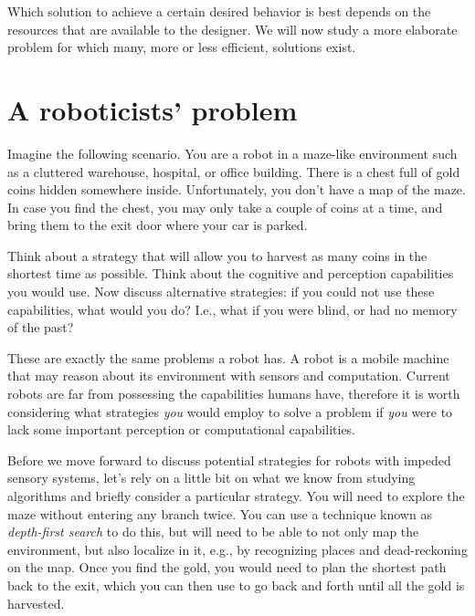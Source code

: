 Which solution to achieve a certain desired behavior is best depends on the resources that are available to the designer. We will now study a more elaborate problem for which many, more or less efficient, solutions exist.

\section{A roboticists' problem}
Imagine the following scenario. You are a robot in a maze-like environment such as a cluttered warehouse, hospital, or office building. There is a chest full of gold coins hidden somewhere inside. Unfortunately, you don't have a map of the maze. In case you find the chest, you may only take a couple of coins at a time, and bring them to the exit door where your car is parked.

\begin{mdframed}
Think about a strategy that will allow you to harvest as many coins in the shortest time as possible. Think about the cognitive and perception capabilities you would use. Now discuss alternative strategies: if you could not use these capabilities, what would you do? I.e., what if you were blind, or had no memory of the past?
\end{mdframed}

These are exactly the same problems a robot has. A robot is a mobile machine that may reason about its environment with sensors and computation. Current robots are far from possessing the capabilities humans have, therefore it is worth considering what strategies \textsl{you} would employ to solve a problem if \textsl{you} were to lack some important perception or computational capabilities.

Before we move forward to discuss potential strategies for robots with impeded sensory systems, let's rely on a little bit on what we know from studying algorithms and briefly consider a particular strategy. You will need to explore the maze without entering any branch twice. You can use a technique known as \textsl{depth-first search} to do this, but will need to be able to not only map the environment, but also localize in it, e.g., by recognizing places and dead-reckoning on the map. Once you find the gold, you would need to plan the shortest path back to the exit, which you can then use to go back and forth until all the gold is harvested. %

